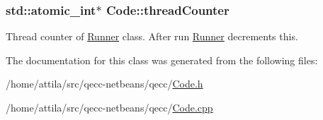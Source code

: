 \subsubsection[{\texorpdfstring{thread\+Counter}{threadCounter}}]{\setlength{\rightskip}{0pt plus 5cm}std\+::atomic\+\_\+int$\ast$ Code\+::thread\+Counter}\hypertarget{class_code_a3c6a29ddf07c39bda3e78d05cada42b5}{}\label{class_code_a3c6a29ddf07c39bda3e78d05cada42b5}
Thread counter of \hyperlink{class_runner}{Runner} class. After run \hyperlink{class_runner}{Runner} decrements this. 

The documentation for this class was generated from the following files\+:\begin{DoxyCompactItemize}
\item 
/home/attila/src/qecc-\/netbeans/qecc/\hyperlink{_code_8h}{Code.\+h}\item 
/home/attila/src/qecc-\/netbeans/qecc/\hyperlink{_code_8cpp}{Code.\+cpp}\end{DoxyCompactItemize}
